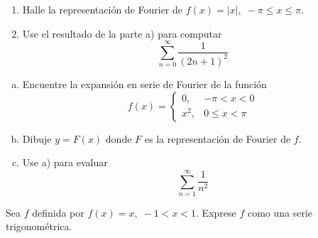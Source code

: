 \documentclass[11pt]{article}
\begin{document}
\begin{question} %
    \begin{enumerate}[ a) ]
    \item Halle la representación de Fourier de $f(x) = |x|, \; -\pi \leq x \leq \pi$.
    \item Use el resultado de la parte a) para computar
        \[ \sum_{n = 0}^{\infty} \frac{1}{(2 n + 1)^2} \]
\end{enumerate}
\end{question}

\begin{question} %
\begin{enumerate}[a)]
\item Encuentre la expansión en serie de Fourier de la función
    \[ f(x) = 
        \begin{cases}
            0,& -\pi < x < 0 \\
            x^2,& 0 \leq x < \pi
        \end{cases} \]
\item Dibuje $y = F(x)$ donde $F$ es la representación de Fourier de $f$.
\item Use a) para evaluar
    \[ \sum_{n = 1}^{\infty} \frac{1}{n^2} \]
\end{enumerate}
\end{question}

\begin{question} %
Sea $f$ definida por $f(x) = x, \; -1 < x < 1$. Exprese $f$ como una serie trigonométrica.
\end{question}
\end{document}
